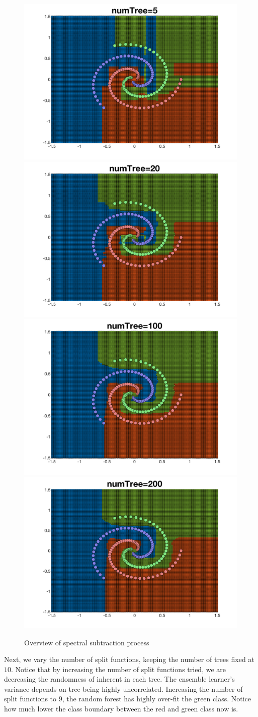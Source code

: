 \documentclass[a4paper,pra,twocolumn,10pt,aps,longbibliography,nobalancelastpage]{revtex4-1}
\begin{document}
\begin{figure}[H]
	\centering
    \includegraphics[width=0.40\columnwidth]{ax_5_trees}
	\includegraphics[width=0.40\columnwidth]{ax_20_trees}
    \includegraphics[width=0.40\columnwidth]{ax_100_trees}
    \includegraphics[width=0.40\columnwidth]{ax_200_trees}
    \caption{Overview of spectral subtraction process}
\end{figure}

Next, we vary the number of split functions, keeping the number of trees fixed at $10$. Notice that by increasing the number of split functions tried, we are decreasing the randomness of inherent in each tree. The ensemble learner's variance depends on tree being highly uncorrelated. Increasing the number of split functions to $9$, the random forest has highly over-fit the green class. Notice how much lower the class boundary between the red and green class now is.
\end{document}
